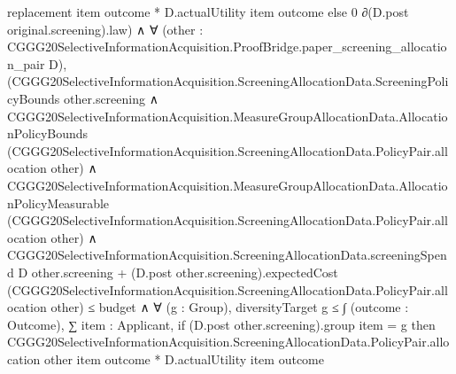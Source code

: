 \documentclass[10pt]{article}
\begin{document}
\begin{ReviewVerbatim}
                                                    replacement item outcome *
                                                  D.actualUtility item outcome
                                              else 0 ∂(D.post original.screening).law) ∧
                                      ∀
                                        (other :
                                          CGGG20SelectiveInformationAcquisition.ProofBridge.paper_screening_allocation_pair
                                            D),
                                        (CGGG20SelectiveInformationAcquisition.ScreeningAllocationData.ScreeningPolicyBounds
                                              other.screening ∧
                                            CGGG20SelectiveInformationAcquisition.MeasureGroupAllocationData.AllocationPolicyBounds
                                                (CGGG20SelectiveInformationAcquisition.ScreeningAllocationData.PolicyPair.allocation
                                                  other) ∧
                                              CGGG20SelectiveInformationAcquisition.MeasureGroupAllocationData.AllocationPolicyMeasurable
                                                  (CGGG20SelectiveInformationAcquisition.ScreeningAllocationData.PolicyPair.allocation
                                                    other) ∧
                                                CGGG20SelectiveInformationAcquisition.ScreeningAllocationData.screeningSpend
                                                        D other.screening +
                                                      (D.post other.screening).expectedCost
                                                        (CGGG20SelectiveInformationAcquisition.ScreeningAllocationData.PolicyPair.allocation
                                                          other) ≤
                                                    budget ∧
                                                  ∀ (g : Group),
                                                    diversityTarget g ≤
                                                      ∫ (outcome : Outcome),
                                                        ∑ item : Applicant,
                                                          if (D.post other.screening).group item = g then
                                                            CGGG20SelectiveInformationAcquisition.ScreeningAllocationData.PolicyPair.allocation
                                                                other item outcome *
                                                              D.actualUtility item outcome

\end{ReviewVerbatim}
\end{document}

